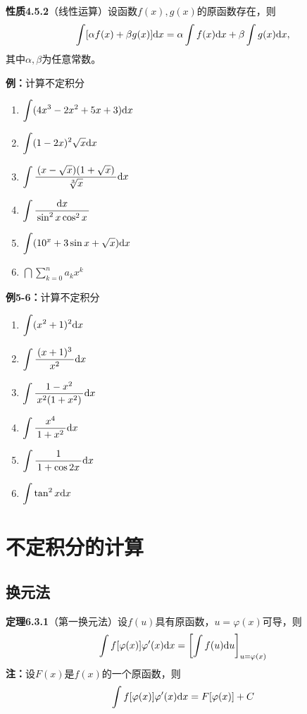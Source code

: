{\bf 性质4.5.2}（线性运算）设函数$f(x),g(x)$的原函数存在，则
$$\int[\alpha f(x)+\beta g(x)]\mathrm{d} x=\alpha\int f(x)\mathrm{d} x+\beta\int g(x)\mathrm{d} x,$$
其中$\alpha,\beta$为任意常数。

{\bf 例：}计算不定积分
\begin{enumerate}[(1)]
  \setlength{\itemindent}{1cm}
  \item $\displaystyle\int (4x^3-2x^2+5x+3)\mathrm{d} x$
  \item $\displaystyle\int(1-2x)^2\sqrt x\mathrm{d} x$
  \item $\displaystyle\int\displaystyle\frac{\,{(x-\sqrt x)(1+\sqrt x)}\,}{\,{\sqrt[3]x}\,}\mathrm{d} x$
  \item $\displaystyle\int\displaystyle\frac{\,{\mathrm{d} x}\,}{\,{\sin^2x\cos^2x}\,}$
  \item $\displaystyle\int(10^x+3\sin x+\sqrt x)\mathrm{d} x$
  \item $\dint\sum\limits_{k=0}^na_kx^k$
\end{enumerate}

{\bf 例5-6：}计算不定积分
\begin{enumerate}[(1)]
  \setlength{\itemindent}{1cm}
  \item $\displaystyle\int (x^2+1)^2\mathrm{d} x$ 
  \item $\displaystyle\int\displaystyle\frac{\,{(x+1)^3}\,}{\,{x^2}\,}\mathrm{d} x$ 
  \item $\displaystyle\int\displaystyle\frac{\,{1-x^2}\,}{\,{x^2(1+x^2)}\,}\mathrm{d} x$
  \item $\displaystyle\int \displaystyle\frac{\,{x^4}\,}{\,{1+x^2}\,}\mathrm{d} x$ 
  \item $\displaystyle\int\displaystyle\frac{\,{1}\,}{\,{1+\cos 2x}\,}\mathrm{d} x$ 
  \item $\displaystyle\int\tan^2 x\mathrm{d} x$
\end{enumerate}

\section{不定积分的计算}

\subsection{换元法}

{\bf 定理6.3.1}（第一换元法）设$f(u)$具有原函数，$u=\varphi(x)$可导，则
$$\displaystyle\int f[\varphi(x)]\varphi'(x)\mathrm{d} x=\left[\displaystyle\int f(u)
\mathrm{d} u\right]_{u=\varphi(x)}$$
{\bf 注：}设$F(x)$是$f(x)$的一个原函数，则
$$\displaystyle\int f[\varphi(x)]\varphi'(x)\mathrm{d} x=F[\varphi(x)]+C$$

